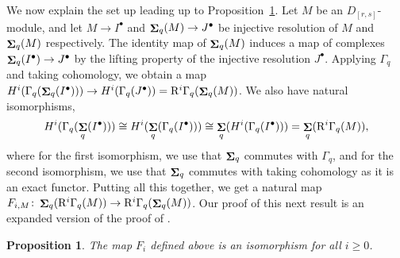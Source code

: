 \documentclass[12pt]{amsart}
\newcommand{\rR}{\mathrm{R}}
\DeclareMathOperator{\Sh}{\bf{\Sigma}}
\newcommand{\Drs}{D_{[r,s]}}
\newcommand{\mShq}{\Sh_{q}}
\newcommand{\mGaq}{\Gamma_{q}}
\numberwithin{equation}{section}
\newtheorem{proposition}[equation]{Proposition}
\theoremstyle{definition}
\theoremstyle{plain}
\begin{document}
We now explain the set up leading up to Proposition~\ref{prop:shcommutesderivedgamma}. Let $M$ be an $\Drs$-module, and let $M \to I^\bullet$ and $\mShq(M) \to J^\bullet$ be injective resolution of $M$ and $\mShq(M)$ respectively. The identity map of $\mShq(M)$ induces a map of complexes $\mShq(I^\bullet) \to J^\bullet$ by the lifting property of the injective resolution $J^\bullet$. Applying $\mGaq$ and taking cohomology, we obtain a map $ H^i(\mGaq(\mShq(I^\bullet))) \to H^i(\mGaq(J^\bullet)) = \rR^i\mGaq(\mShq(M))$. We also have natural isomorphisms,
\begin{displaymath}H^i(\mGaq(\mShq(I^\bullet))) \cong H^i(\mShq(\mGaq(I^\bullet))) \cong \mShq(H^i(\mGaq(I^\bullet))) = \mShq(\rR^i\mGaq(M)),
\end{displaymath}
where for the first isomorphism, we use that $\mShq$ commutes with $\mGaq$, and for the second isomorphism, we use that $\mShq$ commutes with taking cohomology as it is an exact functor.
Putting all this together, we get a natural map $F_{i,M} \colon \mShq(\rR^i\mGaq(M)) \to \rR^i\mGaq(\mShq(M))$.
Our proof of this next result is an expanded version of the proof of \cite[Proposition~A.3]{dj16lc}.
\begin{proposition}\label{prop:shcommutesderivedgamma}
The map $F_i$ defined above is an isomorphism for all $i \ge 0$.
\end{proposition}
\end{document}

